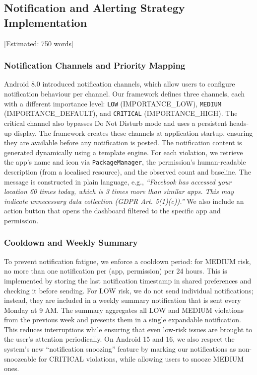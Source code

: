 \subsection{Notification and Alerting Strategy Implementation} [Estimated: 750 words]

\subsubsection{Notification Channels and Priority Mapping}

Android 8.0 introduced notification channels, which allow users to configure notification behaviour per channel. Our framework defines three channels, each with a different importance level: \texttt{LOW} (IMPORTANCE\_LOW), \texttt{MEDIUM} (IMPORTANCE\_DEFAULT), and \texttt{CRITICAL} (IMPORTANCE\_HIGH). The critical channel also bypasses Do Not Disturb mode and uses a persistent heads-up display. The framework creates these channels at application startup, ensuring they are available before any notification is posted. The notification content is generated dynamically using a template engine. For each violation, we retrieve the app's name and icon via \texttt{PackageManager}, the permission's human-readable description (from a localised resource), and the observed count and baseline. The message is constructed in plain language, e.g., \textit{``Facebook has accessed your location 60 times today, which is 3 times more than similar apps. This may indicate unnecessary data collection (GDPR Art. 5(1)(c)).''} We also include an action button that opens the dashboard filtered to the specific app and permission.

\subsubsection{Cooldown and Weekly Summary}

To prevent notification fatigue, we enforce a cooldown period: for MEDIUM risk, no more than one notification per (app, permission) per 24 hours. This is implemented by storing the last notification timestamp in shared preferences and checking it before sending. For LOW risk, we do not send individual notifications; instead, they are included in a weekly summary notification that is sent every Monday at 9 AM. The summary aggregates all LOW and MEDIUM violations from the previous week and presents them in a single expandable notification. This reduces interruptions while ensuring that even low-risk issues are brought to the user's attention periodically. On Android 15 and 16, we also respect the system's new ``notification snoozing'' feature by marking our notifications as non-snoozeable for CRITICAL violations, while allowing users to snooze MEDIUM ones.


